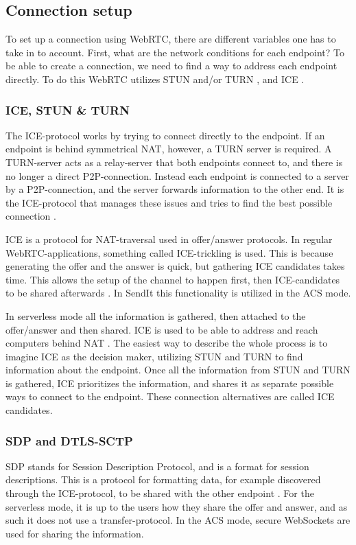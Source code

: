     \subsection{Connection setup}
    \label{sec:conn_setup}
    To set up a connection using WebRTC, there are different variables one has to take in to account. First, what are the network conditions for each endpoint? To be able to create a connection, we need to find a way to address each endpoint directly. To do this WebRTC utilizes STUN \cite{ar_stun} and/or TURN \cite{ar_turn}, and ICE \cite{ar_ice}. 
    \subsubsection*{ICE, STUN \& TURN}
    \label{sec:webrtc_icetri}
    The ICE-protocol works by trying to connect directly to the endpoint. If an endpoint is behind symmetrical NAT, however, a TURN server is required. A TURN-server acts as a relay-server that both endpoints connect to, and there is no longer a direct P2P-connection. Instead each endpoint is connected to a server by a P2P-connection, and the server forwards information to the other end. It is the ICE-protocol that manages these issues and tries to find the best possible connection \cite{ar_webrtc_sign}.

    ICE is a protocol for NAT-traversal used in offer/answer protocols. In regular WebRTC-applications, something called ICE-trickling is used. This is because generating the offer and the answer is quick, but gathering ICE candidates takes time. This allows the setup of the channel to happen first, then ICE-candidates to be shared afterwards \cite{ar_ice_trickle}. In SendIt this functionality is utilized in the ACS mode.

    In serverless mode all the information is gathered, then attached to the offer/answer and then shared. ICE is used to be able to address and reach computers behind NAT \cite{ar_ice}. The easiest way to describe the whole process is to imagine ICE as the decision maker, utilizing STUN and TURN to find information about the endpoint. Once all the information from STUN and TURN is gathered, ICE prioritizes the information, and shares it as separate possible ways to connect to the endpoint. These connection alternatives are called ICE candidates.
    \subsubsection*{SDP and DTLS-SCTP}
    SDP stands for Session Description Protocol, and is a format for session descriptions. This is a protocol for formatting data, for example discovered through the ICE-protocol, to be shared with the other endpoint \cite{ar_sdp}. For the serverless mode, it is up to the users how they share the offer and answer, and as such it does not use a transfer-protocol. In the ACS mode, secure WebSockets are used for sharing the information.

